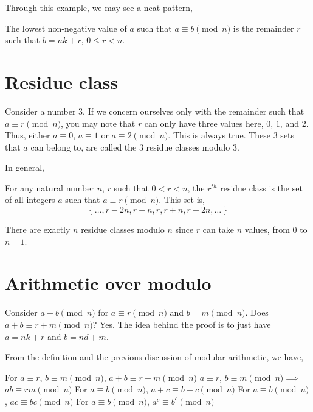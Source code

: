 Through this example, we may see a neat pattern,

\begin{lemma}
    The lowest non-negative value of \(a\) such that \(a \equiv b \pmod{n}\) is the remainder \(r\)
    such that \(b = nk + r\), \(0 \le r < n\). 
\end{lemma}

\section{Residue class}

Consider a number \(3\). If we concern ourselves only with the remainder such that \(a \equiv r \pmod{n}\),
you may note that \(r\) can only have three values here, \(0\), \(1\), and \(2\). Thus, either
\(a \equiv 0\), \(a \equiv 1\) or \(a \equiv 2 \pmod{n}\). This is always true. These \(3\) sets
that \(a\) can belong to, are called the \(3\) residue classes modulo \(3\).

In general,

\begin{definition}
    For any natural number \(n\), \(r\) such that \(0 < r < n\), the \(r^{th}\) residue class is
    the set of all integers \(a\) such that \(a \equiv r \pmod{n}\). This set is,
    \[
        \left\{\dots, r - 2n, r - n, r, r + n, r + 2n, \dots\right\}
    \]
\end{definition}

There are exactly \(n\) residue classes modulo \(n\) since \(r\) can take \(n\) values, from \(0\)
to \(n - 1\).

\section{Arithmetic over modulo}

Consider \(a + b \pmod{n}\) for \(a \equiv r \pmod{n}\) and \(b = m \pmod{n}\). Does \(a + b \equiv r + m
\pmod{n}\)? Yes. The idea behind the proof is to just have \(a = nk + r\) and \(b = nd + m\). 

\begin{proposition}
    From the definition and the previous discussion of modular arithmetic, we have,
    \begin{enumerate}
        \ii For \(a \equiv r\), \(b \equiv m \pmod{n}\), \(a + b \equiv r + m \pmod{n}\)
        \ii \(a \equiv r\), \(b \equiv m \pmod{n} \implies\) \(ab \equiv rm \pmod{n}\)
        \ii For \(a \equiv b \pmod{n}\), \(a + c \equiv b + c \pmod{n}\)
        \ii For \(a \equiv b \pmod{n}\), \(ac \equiv bc \pmod{n}\)
        \ii For \(a \equiv b \pmod{n}\), \(a^c \equiv b^c \pmod{n}\)
    \end{enumerate}
\end{proposition}

